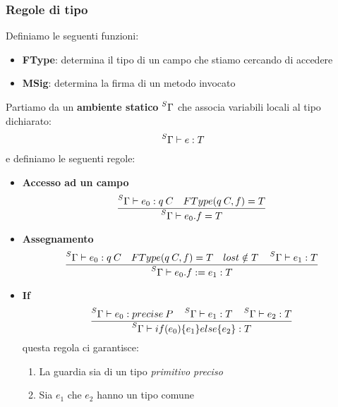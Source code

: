 \subsubsection{Regole di tipo}
Definiamo le seguenti funzioni:
\begin{itemize}
	\item \textbf{FType}: determina il tipo di un campo che stiamo cercando di accedere
	\item \textbf{MSig}: determina la firma di un metodo invocato
\end{itemize}
Partiamo da un \textbf{ambiente statico} $\prescript{S}{}{\Gamma}$ che associa variabili locali al tipo dichiarato:
\begin{equation}
	\prescript{S}{}{\Gamma} \vdash e : T
\end{equation}
e definiamo le seguenti regole:
\begin{itemize}
	\item \textbf{Accesso ad un campo}
	\begin{equation}
		\frac{\prescript{S}{}{\Gamma} \vdash e_0 : q \: C \quad FType(q \: C, f) = T }{\prescript{S}{}{\Gamma}\vdash e_0.f = T}
	\end{equation}
	\item \textbf{Assegnamento}
	\begin{equation}
		\frac{\prescript{S}{}{\Gamma} \vdash e_0 : q \: C \quad FType(q \: C, f) = T \quad lost \notin T \quad\prescript{S}{}{\Gamma} \vdash e_1:T}{\prescript{S}{}{\Gamma} \vdash e_0.f := e_1 : T}
	\end{equation}
	\item \textbf{If}
	\begin{equation}
		\frac{\prescript{S}{}{\Gamma} \vdash e_0 : precise \: P \quad \prescript{S}{}{\Gamma} \vdash e_1 : T \quad \prescript{S}{}{\Gamma} \vdash e_2 :T}{\prescript{S}{}{\Gamma} \vdash if(e_0)\{e_1\} else \{e_2\}:T}
	\end{equation}
	questa regola ci garantisce:
	\begin{enumerate}
		\item La guardia sia di un tipo \textit{primitivo preciso}
		\item Sia $e_1$ che $e_2$ hanno un tipo comune
	\end{enumerate}
\end{itemize}


